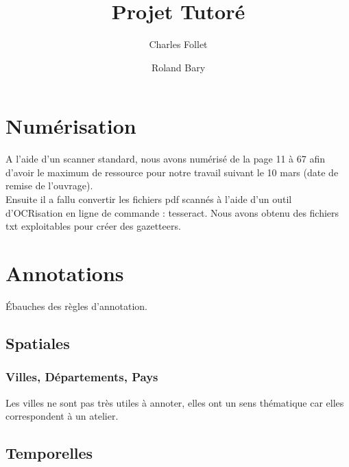 \documentclass[a4paper, 11pt]{article}
\begin{document}
\title{Projet Tutoré}
\author{Charles Follet \and Roland Bary}
\maketitle
\tableofcontents
\newpage
\section{Numérisation}
A l'aide d'un scanner standard, nous avons numérisé de la page 11 à 67 afin d'avoir le maximum de ressource pour notre travail suivant le 10 mars (date de remise de l'ouvrage).\\
Ensuite il a fallu convertir les fichiers pdf scannés à l'aide d'un outil d'OCRisation en ligne de commande : tesseract. Nous avons obtenu des fichiers txt exploitables pour créer des gazetteers.
\section{Annotations}
Ébauches des règles d'annotation.
\subsection{Spatiales}
\subsubsection{Villes, Départements, Pays}
Les villes ne sont pas très utiles à annoter, elles ont un sens thématique car elles correspondent à un atelier.
\newpage
\subsection{Temporelles}
\end{document}

